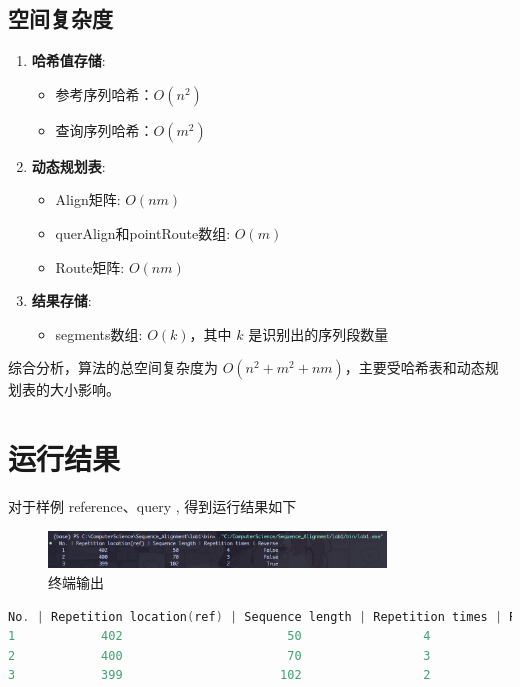 \documentclass[12pt, a4paper, oneside]{ctexart}
\begin{document}
    \subsection{空间复杂度}
    
    \begin{enumerate}
        \item \textbf{哈希值存储}: 
        \begin{itemize}
            \item 参考序列哈希：$O(n^2)$
            \item 查询序列哈希：$O(m^2)$
        \end{itemize}
        
        \item \textbf{动态规划表}: 
        \begin{itemize}
            \item Align矩阵: $O(nm)$
            \item querAlign和pointRoute数组: $O(m)$
            \item Route矩阵: $O(nm)$
        \end{itemize}
        
        \item \textbf{结果存储}: 
        \begin{itemize}
            \item segments数组: $O(k)$，其中 $k$ 是识别出的序列段数量
        \end{itemize}
    \end{enumerate}
    
    综合分析，算法的总空间复杂度为 $O(n^2 + m^2 + nm)$，主要受哈希表和动态规划表的大小影响。

    \section{运行结果}

    对于样例 reference、query , 得到运行结果如下
    \begin{figure}[htbp]
        \centering
        \includegraphics[width=0.8\textwidth]{运行结果.png}
        \caption{终端输出}
    \end{figure}

    \begin{center}
        \begin{lstlisting}[language=C, numbers=none, xleftmargin=40pt, frame=none, basicstyle=\scriptsize\ttfamily]
No. | Repetition location(ref) | Sequence length | Repetition times | Reverse
1            402                       50                 4            False
2            400                       70                 3            False
3            399                      102                 2             True
        \end{lstlisting}
        \end{center}
\end{document}
